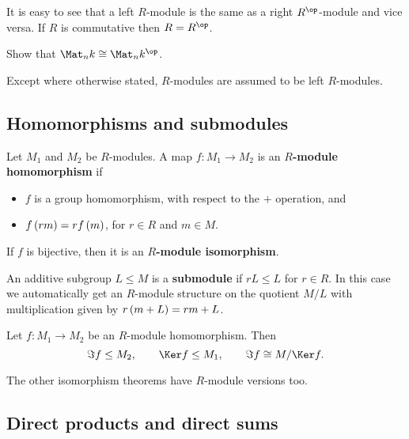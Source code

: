 It is easy to see that a left $ R $-module is the same as a right $ R^{\op} $-module and vice versa. If $ R $ is commutative then $ R = R^{\op} $.

\begin{exercise*}
Show that $ \Mat_n k \cong \Mat_n k^{\op} $.
\end{exercise*}

Except where otherwise stated, $ R $-modules are assumed to be left $ R $-modules.

\pagebreak

\subsection{Homomorphisms and submodules}

\begin{definition}
Let $ M_1 $ and $ M_2 $ be $ R $-modules. A map $ f : M_1 \to M_2 $ is an \textbf{$ R $-module homomorphism} if
\begin{itemize}
\item $ f $ is a group homomorphism, with respect to the $ + $ operation, and
\item $ f\br{rm} = rf\br{m} $, for $ r \in R $ and $ m \in M $.
\end{itemize}
If $ f $ is bijective, then it is an \textbf{$ R $-module isomorphism}.
\end{definition}

\begin{definition}
An additive subgroup $ L \le M $ is a \textbf{submodule} if $ rL \le L $ for $ r \in R $. In this case we automatically get an $ R $-module structure on the quotient $ M / L $ with multiplication given by $ r\br{m + L} = rm + L $.
\end{definition}

\begin{theorem}
Let $ f : M_1 \to M_2 $ be an $ R $-module homomorphism. Then
$$ \Im f \le M_2, \qquad \Ker f \le M_1, \qquad \Im f \cong M / \Ker f. $$
\end{theorem}

The other isomorphism theorems have $ R $-module versions too.

\subsection{Direct products and direct sums}


